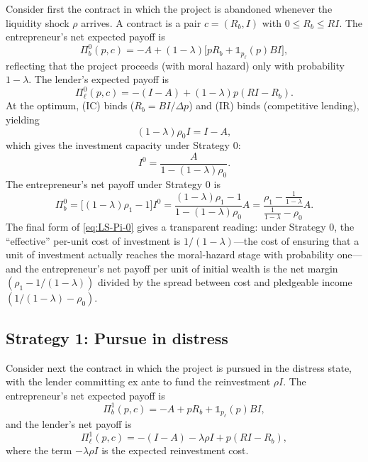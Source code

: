 \documentclass[11pt,a4paper,oneside]{book}
\def\leq{\leqslant}
\theoremstyle{plain}
\theoremstyle{definition}
\theoremstyle{remark}
\numberwithin{equation}{chapter}
\begin{document}
Consider first the contract in which the project is abandoned whenever the liquidity shock $\rho$ arrives.
A contract is a pair $c = (R_b, I)$ with $0 \leq R_b \leq RI$.
The entrepreneur's net expected payoff is
\begin{equation}\label{eq:LS-Pi-b-0}
  \Pi_b^0(p, c) = -A + (1-\lambda)\bigl[p R_b + \mathbb{1}_{p_\ell}(p) BI\bigr],
\end{equation}
reflecting that the project proceeds (with moral hazard) only with probability $1-\lambda$.
The lender's expected payoff is
\begin{equation}\label{eq:LS-Pi-ell-0}
  \Pi_\ell^0(p, c) = -(I-A) + (1-\lambda) p (RI - R_b).
\end{equation}
At the optimum, (IC) binds ($R_b = BI/\Delta p$) and (IR) binds (competitive lending), yielding
\begin{equation*}
  (1-\lambda) \rho_0 I = I - A,
\end{equation*}
which gives the investment capacity under Strategy 0:
\begin{equation}\label{eq:LS-I-0}
  I^0 = \frac{A}{1 - (1-\lambda) \rho_0}.
\end{equation}
The entrepreneur's net payoff under Strategy 0 is
\begin{equation}\label{eq:LS-Pi-0}
  \Pi_b^0 = \bigl[(1-\lambda) \rho_1 - 1\bigr] I^0 = \frac{(1-\lambda)\rho_1 - 1}{1 - (1-\lambda)\rho_0} A = \frac{\rho_1 - \frac{1}{1-\lambda}}{\frac{1}{1-\lambda} - \rho_0} A.
\end{equation}
The final form of \eqref{eq:LS-Pi-0} gives a transparent reading: under Strategy 0, the ``effective'' per-unit cost of investment is $1/(1-\lambda)$---the cost of ensuring that a unit of investment actually reaches the moral-hazard stage with probability one---and the entrepreneur's net payoff per unit of initial wealth is the net margin $(\rho_1 - 1/(1-\lambda))$ divided by the spread between cost and pledgeable income $(1/(1-\lambda) - \rho_0)$.

\subsection{Strategy 1: Pursue in distress}

Consider next the contract in which the project is pursued in the distress state, with the lender committing ex ante to fund the reinvestment $\rho I$.
The entrepreneur's net expected payoff is
\begin{equation}\label{eq:LS-Pi-b-1}
  \Pi_b^1(p, c) = -A + p R_b + \mathbb{1}_{p_\ell}(p) BI,
\end{equation}
and the lender's net payoff is
\begin{equation}\label{eq:LS-Pi-ell-1}
  \Pi_\ell^1(p, c) = -(I-A) - \lambda \rho I + p (RI - R_b),
\end{equation}
where the term $-\lambda \rho I$ is the expected reinvestment cost.
\end{document}
